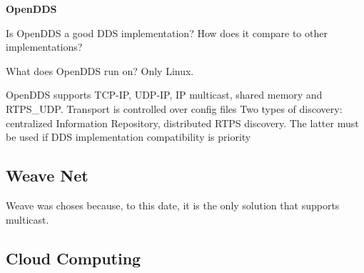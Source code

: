 \textbf{OpenDDS}

Is OpenDDS a good DDS implementation? How does it compare to other implementations?

What does OpenDDS run on? Only Linux.

OpenDDS supports TCP-IP, UDP-IP, IP multicast, shared memory and RTPS\_UDP. Transport is controlled over config files
Two types of discovery: centralized Information Repository, distributed RTPS discovery. The latter must be used if DDS implementation compatibility is priority


\subsection{Weave Net}

Weave was choses because, to this date, it is the only solution that supports multicast.


\subsection{Cloud Computing}





